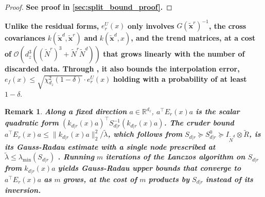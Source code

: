 \documentclass[preprint]{elsarticle}
\newtheorem{remark}{Remark}
\begin{document}
\begin{proof}
    \textbf{See proof in \cref{sec:split_bound_proof}.}
\end{proof}

\textbf{Unlike the residual forms,} $e_r^U(x)$ \textbf{only involves} $G(\tilde{\mathbf{x}}^r)^{-1}$\textbf{, the cross covariances} $k(\tilde{\mathbf{x}}^d,\tilde{\mathbf{x}}^r)$ \textbf{and} $k(\tilde{\mathbf{x}}^d,x)$\textbf{, and the trend matrices, at a cost of} $\mathcal{O}\left(d_z^3\left(\left(\tilde{N}^r\right)^3+\tilde{N}^r\tilde{N}^d\right)\right)$ \textbf{that grows linearly with the number of discarded data. Through , it also bounds the interpolation error,} $e_f(x)\leq\sqrt{\chi^2_{d_z}(1-\delta)}\cdot e_r^U(x)$ \textbf{holding with a probability of at least} $1-\delta$.

\begin{remark}
    \textbf{Along a fixed direction} $a\in\mathbb{R}^{d_z}$, $a^\top E_r(x)a$ \textbf{is the scalar quadratic form} $\left(k_{d|r}(x)a\right)^\top S_{d|r}^{-1}\left(k_{d|r}(x)a\right)$\textbf{. The cruder bound} $a^\top E_r(x)a\leq\|k_{d|r}(x)a\|_2^2/\tilde{\lambda}$\textbf{, which follows from} $S_{d|r}\succeq S^0_{d|r}\succeq I_{\tilde{N}^d}\otimes\tilde{R}$\textbf{, is its Gauss-Radau estimate with a single node prescribed at} $\tilde{\lambda}\leq\lambda_{\min}(S_{d|r})$ \textbf{\cite{bib:matrix-moments}. Running} $m$ \textbf{iterations of the Lanczos algorithm on} $S_{d|r}$ \textbf{from} $k_{d|r}(x)a$ \textbf{yields Gauss-Radau upper bounds that converge to} $a^\top E_r(x)a$ \textbf{as} $m$ \textbf{grows, at the cost of} $m$ \textbf{products by} $S_{d|r}$ \textbf{instead of its inversion.}\label{rem:gauss_radau}
\end{remark}
\end{document}
